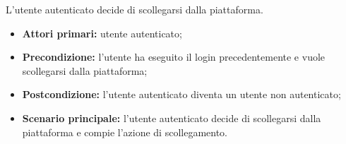 \label{logout}

L'utente autenticato decide di scollegarsi dalla piattaforma.
\begin{itemize}
    \item \textbf{Attori primari:} utente autenticato;
    \item \textbf{Precondizione:} l'utente ha eseguito il login precedentemente e vuole scollegarsi dalla piattaforma;
    \item \textbf{Postcondizione:} l'utente autenticato diventa un utente non autenticato;
    \item \textbf{Scenario principale:} l'utente autenticato decide di scollegarsi dalla piattaforma e compie l'azione di scollegamento.
\end{itemize}
